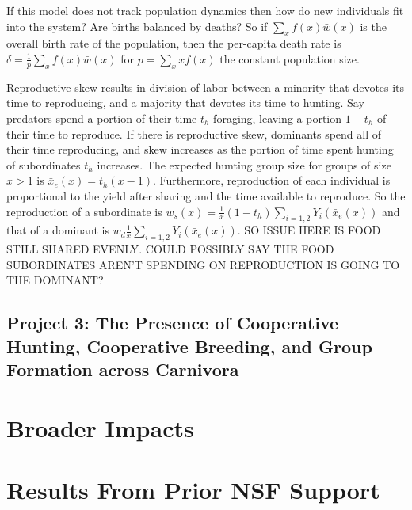 If this model does not track population dynamics then how do new individuals fit into the system? Are births balanced by deaths? So if $\sum_x f(x) \bar{w}(x)$ is the overall birth rate of the population, then the per-capita death rate is $\delta = \frac{1}{p} \sum_x f(x) \bar{w}(x)$ for $p = \sum_x x f(x)$ the constant population size.

Reproductive skew results in division of labor between a minority that devotes its time to reproducing, and a majority that devotes its time to hunting. Say predators spend a portion of their time $t_h$ foraging, leaving a portion $1 - t_h$ of their time to reproduce. If there is reproductive skew, dominants spend all of their time reproducing, and skew increases as the portion of time spent hunting of subordinates $t_h$ increases. The expected hunting group size for groups of size $x > 1$ is $\bar{x}_e(x) = t_h (x - 1)$. Furthermore, reproduction of each individual is proportional to the yield after sharing and the time available to reproduce. So the reproduction of a subordinate is $w_s(x) = \frac{1}{x} (1 - t_h) \sum_{i=1,2} Y_i(\bar{x}_e(x))$ and that of a dominant is $w_d \frac{1}{x} \sum_{i=1,2} Y_i(\bar{x}_e(x))$. SO ISSUE HERE IS FOOD STILL SHARED EVENLY. COULD POSSIBLY SAY THE FOOD SUBORDINATES AREN'T SPENDING ON REPRODUCTION IS GOING TO THE DOMINANT?


\subsection{Project 3: The Presence of Cooperative Hunting, Cooperative Breeding, and Group Formation across Carnivora}

\section{Broader Impacts}

\section{Results From Prior NSF Support}


